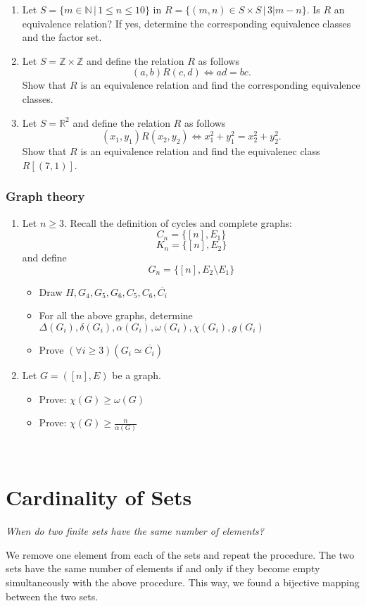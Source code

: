 \documentclass[11pt,paper=b5,footinclude,headinclude]{scrbook} %
\theoremstyle{remark}
\theoremstyle{definition} %
\theoremstyle{theorem} %
\begin{document}
\begin{enumerate}
\item Let $S= \{m\in \mathbb{N}\,|\, 1\leq n \leq 10\}$ in $R=\{(m,n)\in S\times S\,|\, 3|m-n\}$.
Is $R$ an equivalence relation? If yes, determine the corresponding equivalence classes and the factor set.

\item Let $S = \mathbb{Z}\times \mathbb{Z}$ and define the relation $R$ as follows
$$(a,b)R(c,d)\Leftrightarrow ad = bc.$$
Show that $R$ is an equivalence relation  and find the corresponding equivalence classes.

\item Let  $S =  \mathbb{R}^2$ and define the relation $R$ as follows
$$(x_1,y_1)R(x_2,y_2)\Leftrightarrow x_1^2 + y_1^2 = x_2^2 + y_2^2.$$
Show that $R$ is an equivalence relation  and find the equivalenec class $R[(7,1)]$.



\end{enumerate}
\subsection{Graph theory}
\begin{enumerate}
\item Let $n\ge 3$. Recall the definition of cycles and complete graphs:
\[C_{n}=\{[n], E_{1}\}\]
\[K_{n}=\{[n], E_{2}\}\]
and define
\[G_{n}=\{[n], E_{2} \setminus E_{1}\}\]
\begin{itemize}
    \item Draw \(H, G_{4}, G_{5}, G_{6}, C_{5}, C_{6}, \overline{C_{i}}\)
    \item For all the above graphs, determine \(\Delta(G_{i}), \delta(G_{i}), \alpha(G_{i}), \omega(G_{i}), \chi(G_{i}), g(G_{i})\)
    \item Prove \((\forall i \geq 3) (G_{i} \simeq \overline{C_{i}})\)
\end{itemize}

\item Let \(G = ([n], E)\) be a graph.
\begin{itemize}
\item Prove: \(\chi (G) \geq \omega (G)\)
\item Prove: \(\chi (G) \geq \frac{n}{\alpha(G)}\)
\end{itemize}

\end{enumerate}
\
\chapter{Cardinality of Sets}
{\em When do two finite sets have the same number of elements?

We remove one element from each of the sets and repeat the procedure.
The two sets have the same number of elements if and only if they become empty simultaneously with the above procedure.
This way, we found a bijective mapping between the two sets.}
\end{document}
